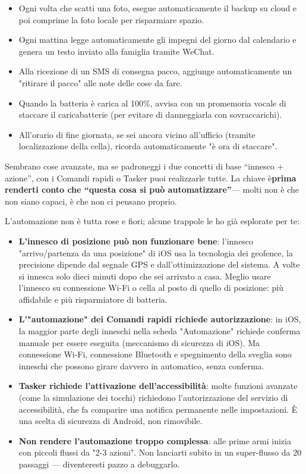 \begin{itemize}
  \item Ogni volta che scatti una foto, esegue automaticamente il backup su cloud e poi comprime la foto locale per risparmiare spazio.
  \item Ogni mattina legge automaticamente gli impegni del giorno dal calendario e genera un testo inviato alla famiglia tramite WeChat.
  \item Alla ricezione di un SMS di consegna pacco, aggiunge automaticamente un "ritirare il pacco" alle note delle cose da fare.
  \item Quando la batteria è carica al 100\%, avvisa con un promemoria vocale di staccare il caricabatterie (per evitare di danneggiarla con sovraccarichi).
  \item All'orario di fine giornata, se sei ancora vicino all'ufficio (tramite localizzazione della cella), ricorda automaticamente "è ora di staccare".
\end{itemize}

Sembrano cose avanzate, ma se padroneggi i due concetti di base “innesco + azione”, con i Comandi rapidi o Tasker puoi realizzarle tutte. La chiave è\textbf{prima renderti conto che “questa cosa si può automatizzare”}— molti non è che non siano capaci, è che non ci pensano proprio.


L'automazione non è tutta rose e fiori; alcune trappole le ho già esplorate per te:

\begin{itemize}
  \item \textbf{L'innesco di posizione può non funzionare bene}: l'innesco "arrivo/partenza da una posizione" di iOS usa la tecnologia dei geofence, la precisione dipende dal segnale GPS e dall'ottimizzazione del sistema. A volte si innesca solo dieci minuti dopo che sei arrivato a casa. Meglio usare l'innesco su connessione Wi-Fi o cella al posto di quello di posizione: più affidabile e più risparmiatore di batteria.
  \item \textbf{L'"automazione" dei Comandi rapidi richiede autorizzazione}: in iOS, la maggior parte degli inneschi nella scheda "Automazione" richiede conferma manuale per essere eseguita (meccanismo di sicurezza di iOS). Ma connessione Wi-Fi, connessione Bluetooth e spegnimento della sveglia sono inneschi che possono girare davvero in automatico, senza conferma.
  \item \textbf{Tasker richiede l'attivazione dell'accessibilità}: molte funzioni avanzate (come la simulazione dei tocchi) richiedono l'autorizzazione del servizio di accessibilità, che fa comparire una notifica permanente nelle impostazioni. È una scelta di sicurezza di Android, non rimovibile.
  \item \textbf{Non rendere l'automazione troppo complessa}: alle prime armi inizia con piccoli flussi da "2-3 azioni". Non lanciarti subito in un super-flusso da 20 passaggi — diventeresti pazzo a debuggarlo.
\end{itemize}

